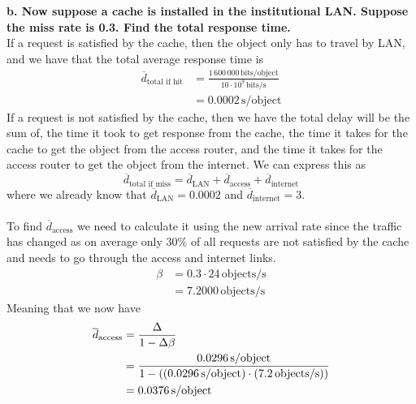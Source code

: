 \textbf{b. Now suppose a cache is installed in the institutional LAN. Suppose the miss rate is 0.3. Find the total response time.} \\
If a request is satisfied by the cache, then the object only has to travel by LAN, and we have that the total average response time is 
\begin{equation*}
\begin{split}
    \overline{d}_\text{total if hit} &= \frac{1 \, 600 \, 000 \, \text{bits/object}}{10 \cdot 10^9 \, \text{bits/s}} \\
    &= 0.0002 \, \text{s/object}
\end{split}
\end{equation*}
If a request is not satisfied by the cache, then we have the total delay will be the sum of, the time it took to get response from the cache, the time it takes for the cache to get the object from the access router, and the time it takes for the access router to get the object from the internet. We can express this as 
\begin{equation*}
    \overline{d}_\text{total if miss} = \overline{d}_\text{LAN} + \overline{d}_\text{access} + \overline{d}_\text{internet}
\end{equation*}
where we already know that $\overline{d}_\text{LAN} = 0.0002$ and $\overline{d}_\text{internet} = 3$. \\
\\
To find $\overline{d}_\text{access}$ we need to calculate it using the new arrival rate since the traffic has changed as on average only 30\% of all requests are not satisfied by the cache and needs to go through the access and internet links.
\begin{equation*}
\begin{split}
    \beta &= 0.3 \cdot 24 \, \text{objects/s} \\
    &= 7.2000 \, \text{objects/s}
\end{split}
\end{equation*}
Meaning that we now have
\begin{equation*}
    \begin{split}
        \overline{d}_\text{access} &= \frac{\Delta}{1 - \Delta \beta} \\
        &= \frac{0.0296 \, \text{s/object}}{1 - \left ( \left (0.0296 \, \text{s/object}\right) \cdot \left ( 7.2 \, \text{objects/s}\right)\right)} \\
        &= 0.0376 \, \text{s/object}
\end{split}
\end{equation*}
